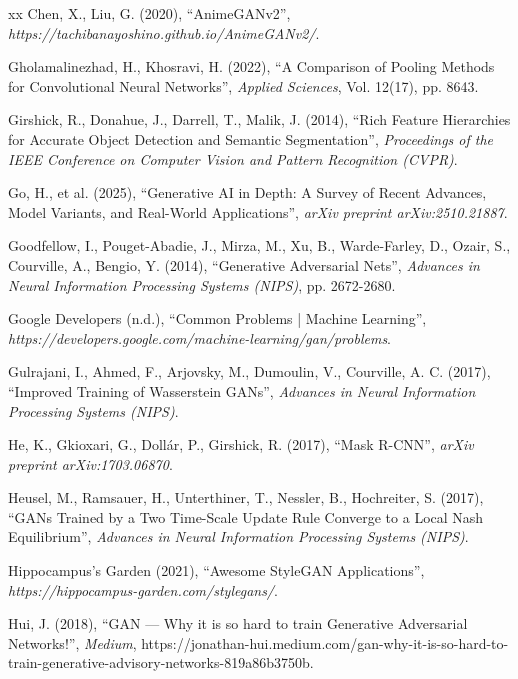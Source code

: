 \begin{thebibliography}{xx}
Chen, X., Liu, G. (2020), ``AnimeGANv2'', {\em https://tachibanayoshino.github.io/AnimeGANv2/}.

Gholamalinezhad, H., Khosravi, H. (2022), ``A Comparison of Pooling Methods for Convolutional Neural Networks'', {\em Applied Sciences}, Vol. 12(17), pp. 8643.

Girshick, R., Donahue, J., Darrell, T., Malik, J. (2014), ``Rich Feature Hierarchies for Accurate Object Detection and Semantic Segmentation'', {\em Proceedings of the IEEE Conference on Computer Vision and Pattern Recognition (CVPR)}.

Go, H., et al. (2025), ``Generative AI in Depth: A Survey of Recent Advances, Model Variants, and Real-World Applications'', {\em arXiv preprint arXiv:2510.21887}.

Goodfellow, I., Pouget-Abadie, J., Mirza, M., Xu, B., Warde-Farley, D., Ozair, S., Courville, A., Bengio, Y. (2014), ``Generative Adversarial Nets'', {\em Advances in Neural Information Processing Systems (NIPS)}, pp. 2672-2680.

Google Developers (n.d.), ``Common Problems | Machine Learning'', {\em https://developers.google.com/machine-learning/gan/problems}.

Gulrajani, I., Ahmed, F., Arjovsky, M., Dumoulin, V., Courville, A. C. (2017), ``Improved Training of Wasserstein GANs'', {\em Advances in Neural Information Processing Systems (NIPS)}.

He, K., Gkioxari, G., Dollár, P., Girshick, R. (2017), ``Mask R-CNN'', {\em arXiv preprint arXiv:1703.06870}.

Heusel, M., Ramsauer, H., Unterthiner, T., Nessler, B., Hochreiter, S. (2017), ``GANs Trained by a Two Time-Scale Update Rule Converge to a Local Nash Equilibrium'', {\em Advances in Neural Information Processing Systems (NIPS)}.

Hippocampus's Garden (2021), ``Awesome StyleGAN Applications'', {\em https://hippocampus-garden.com/stylegans/}.

Hui, J. (2018), ``GAN — Why it is so hard to train Generative Adversarial Networks!'', {\em Medium}, https://jonathan-hui.medium.com/gan-why-it-is-so-hard-to-train-generative-advisory-networks-819a86b3750b.


\end{thebibliography}
